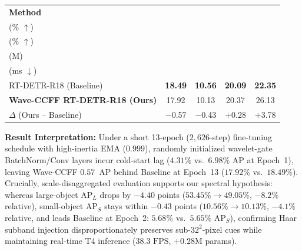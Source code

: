 \documentclass[8pt,a4paper]{article}
\begin{document}
\begin{center}


\label{tab:results}

\small

\begin{tabularx}{\linewidth}{
    @{}X c c c c@{}
}

\toprule

\textbf{Method}
&
\makecell{\textbf{AP$_{50:95}$}\\(\% $\uparrow$)}
&
\makecell{\textbf{AP$_{S}$}\\(\% $\uparrow$)}
&
\makecell{\textbf{Params}\\(M)}
&
\makecell{\textbf{Latency}\\(ms $\downarrow$)}
\\

\midrule

RT-DETR-R18 (Baseline)
&
\textbf{18.49}
&
\textbf{10.56}
&
\textbf{20.09}
&
\textbf{22.35}
\\

\textbf{Wave-CCFF RT-DETR-R18 (Ours)}
&
17.92
&
10.13
&
20.37
&
26.13
\\

\midrule

$\Delta$ (Ours -- Baseline)
&
$-$0.57
&
$-$0.43
&
+0.28
&
+3.78
\\

\bottomrule

\end{tabularx}

\end{center}

\vspace{-5pt}

\textbf{Result Interpretation:}
Under a short 13-epoch ($2{,}626$-step) fine-tuning schedule with high-inertia EMA ($0.999$), randomly initialized wavelet-gate BatchNorm/Conv layers incur cold-start lag ($4.31\%$ vs.\ $6.98\%$ AP at Epoch~1), leaving Wave-CCFF $0.57$~AP behind Baseline at Epoch~13 ($17.92\%$ vs.\ $18.49\%$). Crucially, scale-disaggregated evaluation supports our spectral hypothesis: whereas large-object $\text{AP}_L$ drops by $-4.40$ points ($53.45\% \to 49.05\%$, $-8.2\%$ relative), small-object $\text{AP}_S$ stays within $-0.43$ points ($10.56\% \to 10.13\%$, $-4.1\%$ relative, and leads Baseline at Epoch~2: $5.68\%$ vs.\ $5.65\%$ $\text{AP}_S$), confirming Haar subband injection disproportionately preserves sub-$32^2$-pixel cues while maintaining real-time T4 inference ($38.3\text{ FPS}$, $+0.28\text{M}$ params).
\end{document}
